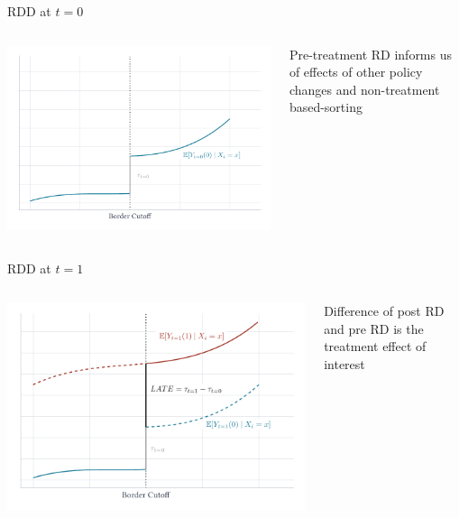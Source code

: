 \documentclass[aspectratio=169,t,11pt,table]{beamer}
\begin{document}
\begin{frame}{RDD at $t = 0$}
  \begin{columns}[T]
    \begin{column}{.65\textwidth}\vspace*{-\bigskipamount}
      \includegraphics[width = \textwidth]{figures/diff_in_disc_pre.pdf}
    \end{column}
    \begin{column}{.35\textwidth}
      Pre-treatment RD informs us of effects of other policy changes and non-treatment based-sorting
    \end{column}
  \end{columns}
\end{frame}

\begin{frame}{RDD at $t = 1$}
  \begin{columns}[T]
    \begin{column}{.65\textwidth}\vspace*{-\bigskipamount}
      \includegraphics[width = \textwidth]{figures/diff_in_disc_post.pdf}
    \end{column}
    \begin{column}{.35\textwidth}
      Difference of post RD and pre RD is the treatment effect of interest
    \end{column}
  \end{columns}
\end{frame}
\end{document}
